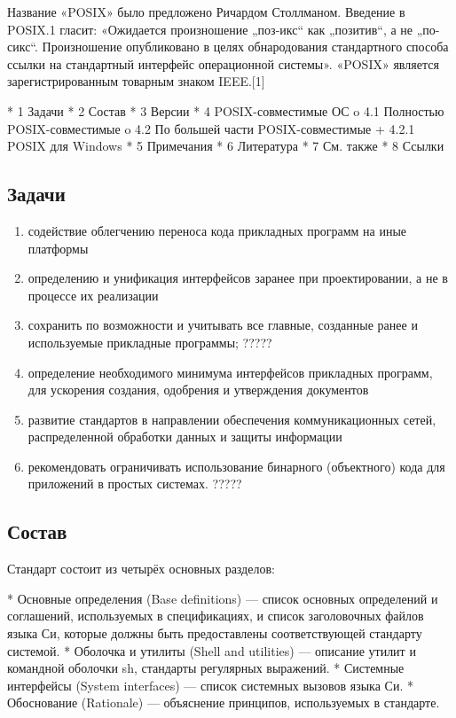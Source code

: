 Название «POSIX» было предложено Ричардом Столлманом. Введение в POSIX.1 гласит: «Ожидается произношение „поз-икс“ как „позитив“, а не „по-сикс“. Произношение опубликовано в целях обнародования стандартного способа ссылки на стандартный интерфейс операционной системы». «POSIX» является зарегистрированным товарным знаком IEEE.[1]

    * 1 Задачи
    * 2 Состав
    * 3 Версии
    * 4 POSIX-совместимые ОС
          o 4.1 Полностью POSIX-совместимые
          o 4.2 По большей части POSIX-совместимые
                + 4.2.1 POSIX для Windows
    * 5 Примечания
    * 6 Литература
    * 7 См. также
    * 8 Ссылки
\subsection{Задачи}
\begin{enumerate}
\item содействие облегчению переноса кода прикладных программ на иные платформы
\item определению и унификация интерфейсов заранее при проектировании, а не в процессе их реализации
\item сохранить по возможности и учитывать все главные, созданные ранее и используемые прикладные программы; ?????
\item определение необходимого минимума интерфейсов прикладных программ, для ускорения создания, одобрения и утверждения документов
\item развитие стандартов в направлении обеспечения коммуникационных сетей, распределенной обработки данных и защиты информации
\item рекомендовать ограничивать использование бинарного (объектного) кода для приложений в простых системах. ?????
\end{enumerate}
\subsection{Состав}
Стандарт состоит из четырёх основных разделов:

    * Основные определения (Base definitions) — список основных определений и соглашений, используемых в спецификациях, и список заголовочных файлов языка Си, которые должны быть предоставлены соответствующей стандарту системой.
    * Оболочка и утилиты (Shell and utilities) — описание утилит и командной оболочки sh, стандарты регулярных выражений.
    * Системные интерфейсы (System interfaces) — список системных вызовов языка Си.
    * Обоснование (Rationale) — объяснение принципов, используемых в стандарте.


